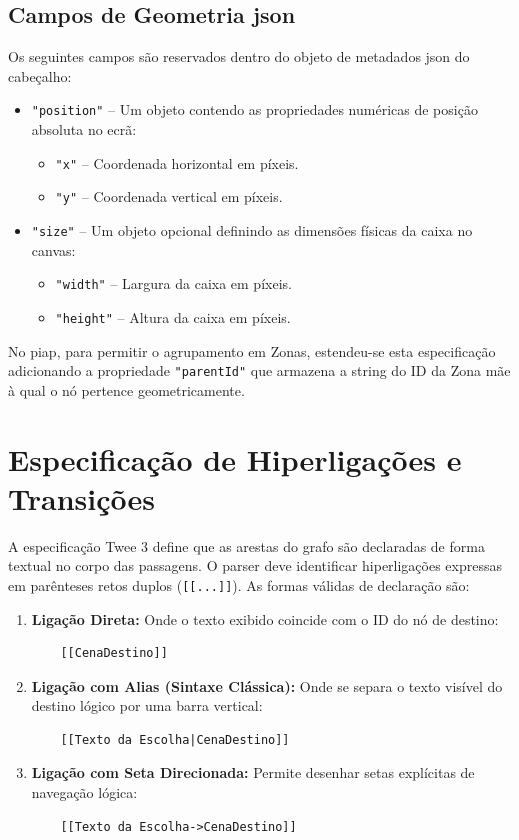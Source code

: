\subsection{Campos de Geometria \gls{json}}
Os seguintes campos são reservados dentro do objeto de metadados \gls{json} do cabeçalho:
\begin{itemize}
    \item \texttt{"position"} -- Um objeto contendo as propriedades numéricas de posição absoluta no ecrã:
    \begin{itemize}
        \item \texttt{"x"} -- Coordenada horizontal em píxeis.
        \item \texttt{"y"} -- Coordenada vertical em píxeis.
    \end{itemize}
    \item \texttt{"size"} -- Um objeto opcional definindo as dimensões físicas da caixa no canvas:
    \begin{itemize}
        \item \texttt{"width"} -- Largura da caixa em píxeis.
        \item \texttt{"height"} -- Altura da caixa em píxeis.
    \end{itemize}
\end{itemize}

No \gls{piap}, para permitir o agrupamento em Zonas, estendeu-se esta especificação adicionando a propriedade \texttt{"parentId"} que armazena a string do ID da Zona mãe à qual o nó pertence geometricamente.

\section{Especificação de Hiperligações e Transições}
A especificação Twee 3 define que as arestas do grafo são declaradas de forma textual no corpo das passagens. O parser deve identificar hiperligações expressas em parênteses retos duplos (\texttt{[[...]]}). As formas válidas de declaração são:
\begin{enumerate}
    \item \textbf{Ligação Direta:} Onde o texto exibido coincide com o ID do nó de destino:
    \begin{verbatim}
    [[CenaDestino]]
    \end{verbatim}
    \item \textbf{Ligação com Alias (Sintaxe Clássica):} Onde se separa o texto visível do destino lógico por uma barra vertical:
    \begin{verbatim}
    [[Texto da Escolha|CenaDestino]]
    \end{verbatim}
    \item \textbf{Ligação com Seta Direcionada:} Permite desenhar setas explícitas de navegação lógica:
    \begin{verbatim}
    [[Texto da Escolha->CenaDestino]]
    \end{verbatim}
\end{enumerate}

